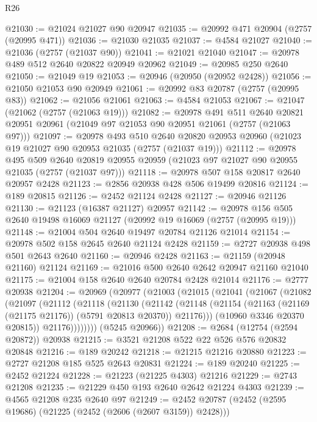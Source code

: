 \begin{lexlean}{R26}
\begin{coremodule}
@21030 := @21024 @21027 @90 @20947
@21035 := @20992 @471 @20904 (@2757 (@20995 @471))
@21036 := @21030 @21035
@21037 := @4584 @21027
@21040 := @21036 (@2757 (@21037 @90))
@21041 := @21021 @21040
@21047 := @20978 @489 @512 @2640 @20822 @20949 @20962
@21049 := @20985 @250 @2640
@21050 := @21049 @19
@21053 := @20946 (@20950 (@20952 @2428))
@21056 := @21050 @21053 @90 @20949
@21061 := @20992 @83 @20787 (@2757 (@20995 @83))
@21062 := @21056 @21061
@21063 := @4584 @21053
@21067 := @21047 (@21062 (@2757 (@21063 @19)))
@21082 := @20978
    @491
    @511
    @2640
    @20821
    @20951
    @20961
    (@21049 @97 @21053 @90 @20951 @21061 (@2757 (@21063 @97)))
@21097 := @20978
    @493
    @510
    @2640
    @20820
    @20953
    @20960
    (@21023 @19 @21027 @90 @20953 @21035 (@2757 (@21037 @19)))
@21112 := @20978
    @495
    @509
    @2640
    @20819
    @20955
    @20959
    (@21023 @97 @21027 @90 @20955 @21035 (@2757 (@21037 @97)))
@21118 := @20978 @507 @158 @20817 @2640 @20957 @2428
@21123 := @2856 @20938 @428 @506 @19499 @20816
@21124 := @189 @20815
@21126 := @2452 @21124 @2428
@21127 := @20946 @21126
@21130 := @21123 (@16387 @21127) @20957
@21142 := @20978 @156 @505 @2640 @19498 @16069 @21127 (@20992 @19 @16069 (@2757 (@20995 @19)))
@21148 := @21004 @504 @2640 @19497 @20784 @21126 @21014
@21154 := @20978 @502 @158 @2645 @2640 @21124 @2428
@21159 := @2727 @20938 @498 @501 @2643 @2640
@21160 := @20946 @2428
@21163 := @21159 (@20948 @21160) @21124
@21169 := @21016 @500 @2640 @2642 @20947 @21160 @21040
@21175 := @21004 @158 @2640 @2640 @20784 @2428 @21014
@21176 := @2777 @20938
@21204 := @20969
    (@20977
      (@21003
        (@21015
          (@21041
            (@21067
              (@21082
                (@21097
                  (@21112
                    (@21118
                      (@21130
                        (@21142
                          (@21148
                            (@21154
                              (@21163 (@21169 (@21175 @21176)) (@5791 @20813 @20370))
                              @21176)))
                        (@10960 @3346 @20370 @20815))
                      @21176))))))))
      (@5245 @20966))
@21208 := @2684 (@12754 (@2594 @20872)) @20938
@21215 := @3521 @21208 @522 @22 @526 @576 @20832 @20848
@21216 := @189 @20242
@21218 := @21215 @21216 @20880
@21223 := @2727 @21208 @185 @525 @2643 @20831
@21224 := @189 @20240
@21225 := @2452 @21224
@21228 := @21223 (@21225 @4303) @21216
@21229 := @2743 @21208
@21235 := @21229 @450 @193 @2640 @2642 @21224 @4303
@21239 := @4565 @21208 @235 @2640 @97
@21249 := @2452 @20787 (@2452 (@2595 @19686) (@21225 (@2452 (@2606 (@2607 @3159)) @2428)))

\end{coremodule}
\end{lexlean}
